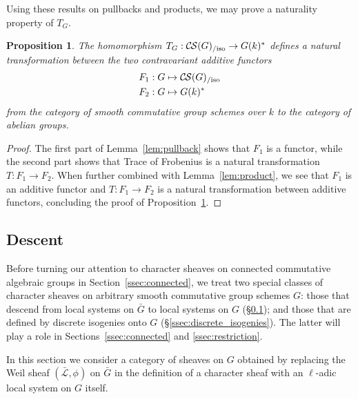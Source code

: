 \documentclass[10pt]{amsart}
\theoremstyle{plain}
\newtheorem{proposition}[theorem]{Proposition}
\theoremstyle{definition}
\theoremstyle{remark}
\newcommand{\Fq}{k}
\newcommand{\TrFrob}[1]{T_{#1}}
\newcommand{\gcs}[1]{{\mathcal{\bar #1}}}
\newcommand{\CS}{{\mathcal{C\hskip-0.8pt S}}}
\newcommand{\CSiso}[1]{\CS(#1)_{/\text{iso}}}
\newcommand{\bG}{\bar{G}}
\begin{document}
Using these results on pullbacks and products, we may prove a naturality property of $\TrFrob{G}$.

\begin{proposition}\label{prop:functorialG}
The homomorphism $\TrFrob{G} : \CSiso{G} \to G(\Fq)^*$ defines a natural transformation
between the two contravariant additive functors
\begin{align*}
F_1 : G &\mapsto \CSiso{G} \\
F_2 : G &\mapsto G(\Fq)^*
\end{align*}
from the category of smooth commutative group schemes over $\Fq$ to the category of abelian groups.
\end{proposition}

\begin{proof}
The first part of Lemma~\ref{lem:pullback} shows that $F_1$ is a functor,
while the second part shows that Trace of Frobenius is a natural transformation
$T: F_1 \to F_2$. When further combined with Lemma~\ref{lem:product},
we see that $F_1$ is an additive functor and $T: F_1 \to F_2$ is a natural
transformation between additive functors,
concluding the proof of Proposition~\ref{prop:functorialG}.
\end{proof}


\subsection{Descent}\label{ssec:descentG}

Before turning our attention to character sheaves on connected commutative algebraic groups in Section~\ref{ssec:connected}, we treat two special classes of character sheaves on arbitrary smooth commutative group schemes $G$: those that descend from local systems on $\bG$ to local systems on $G$ (\S \ref{ssec:descentG}); and those that are defined by discrete isogenies onto $G$ (\S \ref{ssec:discrete_isogenies}). The latter will play a role in Sections~\ref{ssec:connected} and \ref{ssec:restriction}.

In this section we consider a category of sheaves on $G$ obtained by
replacing the Weil sheaf $(\gcs{L}, \phi)$ on $\bG$ in the definition of a character sheaf with an $\ell$-adic local system on $G$ itself.
\end{document}
